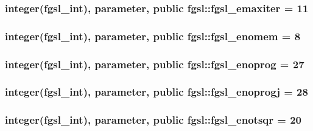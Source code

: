 \subsubsection[{fgsl\+\_\+emaxiter}]{\setlength{\rightskip}{0pt plus 5cm}integer({\bf fgsl\+\_\+int}), parameter, public fgsl\+::fgsl\+\_\+emaxiter = 11}\label{namespacefgsl_a5e63249fa198903f233261cb159a3e28}
\hypertarget{namespacefgsl_a70b026317b5a6f797b14978468ca01d9}{}
\subsubsection[{fgsl\+\_\+enomem}]{\setlength{\rightskip}{0pt plus 5cm}integer({\bf fgsl\+\_\+int}), parameter, public fgsl\+::fgsl\+\_\+enomem = 8}\label{namespacefgsl_a70b026317b5a6f797b14978468ca01d9}
\hypertarget{namespacefgsl_a11266b4068f90334758a26d35c116f73}{}
\subsubsection[{fgsl\+\_\+enoprog}]{\setlength{\rightskip}{0pt plus 5cm}integer({\bf fgsl\+\_\+int}), parameter, public fgsl\+::fgsl\+\_\+enoprog = 27}\label{namespacefgsl_a11266b4068f90334758a26d35c116f73}
\hypertarget{namespacefgsl_ad9567598ce07cacf43815d0453e649bb}{}
\subsubsection[{fgsl\+\_\+enoprogj}]{\setlength{\rightskip}{0pt plus 5cm}integer({\bf fgsl\+\_\+int}), parameter, public fgsl\+::fgsl\+\_\+enoprogj = 28}\label{namespacefgsl_ad9567598ce07cacf43815d0453e649bb}
\hypertarget{namespacefgsl_a0ad3f5a5023fcd60f764cab3b2b07984}{}
\subsubsection[{fgsl\+\_\+enotsqr}]{\setlength{\rightskip}{0pt plus 5cm}integer({\bf fgsl\+\_\+int}), parameter, public fgsl\+::fgsl\+\_\+enotsqr = 20}\label{namespacefgsl_a0ad3f5a5023fcd60f764cab3b2b07984}
\hypertarget{namespacefgsl_a9641f79a70406a1c9f483f01fdb1ccfa}{}
